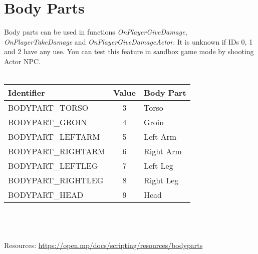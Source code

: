 \documentclass{article}
\begin{document}
\section{Body Parts}
Body parts can be used in functions \textit{OnPlayerGiveDamage}, \textit{OnPlayerTakeDamage} and \textit{OnPlayerGiveDamageActor}. It is unknown if IDs 0, 1 and 2 have any use. You can test this feature in sandbox game mode by shooting Actor NPC.
\\
\\
\begin{tabular}{ |l|c|l| } 
\hline
Identifier & Value & Body Part \\
\hline
BODYPART\_TORSO & 3 & Torso \\ 
BODYPART\_GROIN & 4 & Groin \\
BODYPART\_LEFTARM & 5 & Left Arm \\
BODYPART\_RIGHTARM & 6 & Right Arm \\
BODYPART\_LEFTLEG & 7 & Left Leg \\
BODYPART\_RIGHTLEG & 8 & Right Leg \\
BODYPART\_HEAD & 9 & Head \\
\hline
\end{tabular}
\\
\\
\\Resources: \url{https://open.mp/docs/scripting/resources/bodyparts}
\end{document}
